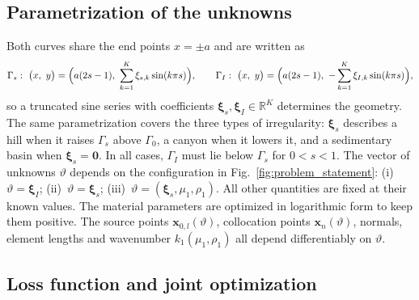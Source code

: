 \subsection{Parametrization of the unknowns}

Both curves share the end points $x=\pm a$ and are written as
\begin{equation}\label{eq:shape}
  \Gamma_s:\ \bigl(x,\ y\bigr) = \Bigl(a(2s-1),\ \sum_{k=1}^{K}\xi_{s,k}\sin(k\pi s)\Bigr),
  \qquad
  \Gamma_I:\ \bigl(x,\ y\bigr) = \Bigl(a(2s-1),\ -\sum_{k=1}^{K}\xi_{I,k}\sin(k\pi s)\Bigr),
\end{equation}
so a truncated sine series with coefficients
$\boldsymbol{\xi}_s,\boldsymbol{\xi}_I\in\mathbb{R}^K$ determines the geometry.
The same parametrization covers the three types of irregularity:
$\boldsymbol{\xi}_s$ describes a hill when it raises $\Gamma_s$ above $\Gamma_0$,
a canyon when it lowers it, and a sedimentary basin when
$\boldsymbol{\xi}_s=\mathbf{0}$. In all cases, $\Gamma_I$ must lie below
$\Gamma_s$ for $0<s<1$.
The vector of unknowns $\vartheta$ depends on the configuration in
Fig.~\ref{fig:problem_statement}:
(i)~$\vartheta = \boldsymbol{\xi}_I$;
(ii)~$\vartheta = \boldsymbol{\xi}_s$;
(iii)~$\vartheta = (\boldsymbol{\xi}_s,\mu_1,\rho_1)$.
All other quantities are fixed at their known values. The material parameters
are optimized in logarithmic form to keep them positive. The source points
$\mathbf{x}_{0,l}(\vartheta)$, collocation points $\mathbf{x}_n(\vartheta)$,
normals, element lengths and wavenumber $k_1(\mu_1,\rho_1)$ all depend
differentiably on $\vartheta$.

\subsection{Loss function and joint optimization}

